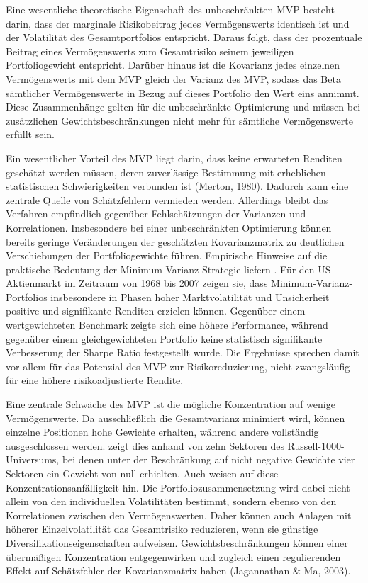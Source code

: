 \documentclass[a4paper, 12pt]{article}
\begin{document}
Eine wesentliche theoretische Eigenschaft des unbeschränkten MVP besteht darin, dass der marginale Risikobeitrag jedes Vermögenswerts identisch ist und der Volatilität des Gesamtportfolios entspricht.
Daraus folgt, dass der prozentuale Beitrag eines Vermögenswerts zum Gesamtrisiko seinem jeweiligen Portfoliogewicht entspricht.
Darüber hinaus ist die Kovarianz jedes einzelnen Vermögenswerts mit dem MVP gleich der Varianz des MVP, sodass das Beta sämtlicher Vermögenswerte in Bezug auf dieses Portfolio den Wert eins annimmt.
Diese Zusammenhänge gelten für die unbeschränkte Optimierung und müssen bei zusätzlichen Gewichtsbeschränkungen nicht mehr für sämtliche Vermögenswerte erfüllt sein.

Ein wesentlicher Vorteil des MVP liegt darin, dass keine erwarteten Renditen geschätzt werden müssen, deren zuverlässige Bestimmung mit erheblichen statistischen Schwierigkeiten verbunden ist (Merton, 1980).
Dadurch kann eine zentrale Quelle von Schätzfehlern vermieden werden.
Allerdings bleibt das Verfahren empfindlich gegenüber Fehlschätzungen der Varianzen und Korrelationen.
Insbesondere bei einer unbeschränkten Optimierung können bereits geringe Veränderungen der geschätzten Kovarianzmatrix zu deutlichen Verschiebungen der Portfoliogewichte führen.
Empirische Hinweise auf die praktische Bedeutung der Minimum-Varianz-Strategie liefern \textcite{behr2008}.
Für den US-Aktienmarkt im Zeitraum von 1968 bis 2007 zeigen sie, dass Minimum-Varianz-Portfolios insbesondere in Phasen hoher Marktvolatilität und Unsicherheit positive und signifikante Renditen erzielen können.
Gegenüber einem wertgewichteten Benchmark zeigte sich eine höhere Performance, während gegenüber einem gleichgewichteten Portfolio keine statistisch signifikante Verbesserung der Sharpe Ratio festgestellt wurde.
Die Ergebnisse sprechen damit vor allem für das Potenzial des MVP zur Risikoreduzierung, nicht zwangsläufig für eine höhere risikoadjustierte Rendite.

Eine zentrale Schwäche des MVP ist die mögliche Konzentration auf wenige Vermögenswerte.
Da ausschließlich die Gesamtvarianz minimiert wird, können einzelne Positionen hohe Gewichte erhalten, während andere vollständig ausgeschlossen werden.
\textcite{lee2011} zeigt dies anhand von zehn Sektoren des Russell-1000-Universums, bei denen unter der Beschränkung auf nicht negative Gewichte vier Sektoren ein Gewicht von null erhielten.
Auch \textcite{maillard2010} weisen auf diese Konzentrationsanfälligkeit hin.
Die Portfoliozusammensetzung wird dabei nicht allein von den individuellen Volatilitäten bestimmt, sondern ebenso von den Korrelationen zwischen den Vermögenswerten.
Daher können auch Anlagen mit höherer Einzelvolatilität das Gesamtrisiko reduzieren, wenn sie günstige Diversifikationseigenschaften aufweisen.
Gewichtsbeschränkungen können einer übermäßigen Konzentration entgegenwirken und zugleich einen regulierenden Effekt auf Schätzfehler der Kovarianzmatrix haben (Jagannathan \& Ma, 2003).
\end{document}
